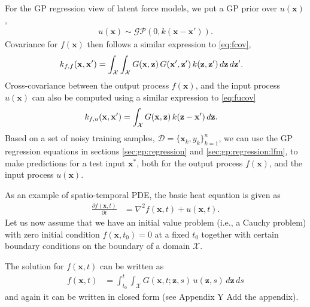 \documentclass[journal]{IEEEtran}
\newcommand{\simo}[1]{{\color{red}#1}}
\begin{document}
For the GP regression view of latent force models, we put a GP prior over $u(\mathbf{x})$,
\begin{align*}
u(\mathbf{x})\sim\mathcal{GP}(0, k(\mathbf{x} - \mathbf{x}')).
\end{align*}
Covariance for $f(\mathbf{x})$ then follows a similar expression to \eqref{eq:fcov},
\begin{equation}
\begin{split}
  k_{f,f}(\mathbf{x}, \mathbf{x}') &=
  \int_{\mathcal{X}}   \int_{\mathcal{X}}
  G(\mathbf{x}, \mathbf{z}) \, G(\mathbf{x}', \mathbf{z}') \, k(\mathbf{z}, \mathbf{z}') \, d\mathbf{z} \, d\mathbf{z}'.
\end{split}
\notag
\end{equation}
Cross-covariance between the output process $f(\mathbf{x})$, and the input process $u(\mathbf{x})$ can also be computed
using a similar expression to \eqref{eq:fucov}
\begin{align}
k_{f,u}(\mathbf{x},\mathbf{x}') & = \int_{\mathcal{X}} G(\mathbf{x}, \mathbf{z})\, k(\mathbf{z} - \mathbf{x}')\, d\mathbf{z}.
\notag
\end{align}
Based on a set of noisy training samples, $\mathcal{D}=\{\mathbf{x}_k, y_k\}_{k=1}^n$, we can
use the GP regression equations in sections \ref{sec:gp:regression} and \ref{sec:gp:regression:lfm}, to make predictions
for a test input $\mathbf{x}^*$, both for the output process $f(\mathbf{x})$, and the input process $u(\mathbf{x})$.

As an example of spatio-temporal PDE, the basic heat equation is given as
\begin{align*}
  \frac{\partial f(\mathbf{x},t)}{\partial t} &= \nabla^2 f(\mathbf{x},t) + u(\mathbf{x},t).
\end{align*}
%
Let us now assume that we have an initial value problem (i.e., a Cauchy problem) with zero initial condition $f(\mathbf{x},t_0) = 0$ at a fixed $t_0$ together with certain boundary conditions on the boundary of a domain $\mathcal{X}$. 

The solution for $f(\mathbf{x},t)$ can be written as
\begin{align*}
f(\mathbf{x},t) & = \int_{t_0}^t \int_{\mathcal{X}} G(\mathbf{x}, t;  \mathbf{z}, s)\,
                u(\mathbf{z},s)\,d\mathbf{z}\,ds
\end{align*}
%
and again it can be written in closed form (see Appendix Y \simo{Add the appendix}).
\end{document}

